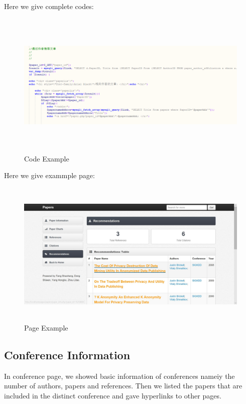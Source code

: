 \documentclass{book}
\begin{document}
Here we give complete codes:
\begin{figure}[H]
\centering
\includegraphics[height=7.0cm,width=16.0cm]{img/yhb_mp_3.png}
\caption{Code Example}
\end{figure}


Here we give exammple page:
\begin{figure}[H]
\centering
\includegraphics[height=7.0cm,width=16.0cm]{img/yhb_paper_4.jpg}
\caption{Page Example}
\end{figure}



\subsection{Conference Information}

In conference page, we showed basic information of conferences nameiy the number of authors, papers and references. Then we listed the papers that are included in the distinct conference and gave hyperlinks to other pages.
\end{document}
